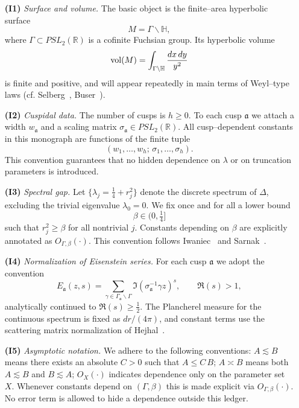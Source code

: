 \begin{itemize}[leftmargin=2em]

  \item[\textbf{(I1)}] \textit{Surface and volume.}  
  The basic object is the finite–area hyperbolic surface
  \[
    M = \Gamma \backslash \mathbb{H},
  \]
  where $\Gamma \subset PSL_{2}(\mathbb{R})$ is a cofinite Fuchsian group.  
  Its hyperbolic volume
  \[
    \operatorname{vol}(M) = \int_{\Gamma \backslash \mathbb{H}} \frac{dx\,dy}{y^{2}}
  \]
  is finite and positive, and will appear repeatedly in main terms of Weyl–type laws
  (cf. Selberg~\cite{Selberg1956}, Buser~\cite{Buser1992}).

  \item[\textbf{(I2)}] \textit{Cuspidal data.}  
  The number of cusps is $h \geq 0$.  
  To each cusp $\mathfrak{a}$ we attach a width $w_{\mathfrak{a}}$ and a scaling matrix 
  $\sigma_{\mathfrak{a}} \in PSL_{2}(\mathbb{R})$.  
  All cusp–dependent constants in this monograph are functions of the finite tuple
  \[
    (w_{1}, \dots, w_{h}; \, \sigma_{1}, \dots, \sigma_{h}).
  \]
  This convention guarantees that no hidden dependence on $\lambda$ or on truncation
  parameters is introduced.

  \item[\textbf{(I3)}] \textit{Spectral gap.}  
  Let $\{ \lambda_{j} = \tfrac14 + r_{j}^{2} \}$ denote the discrete spectrum of $\Delta$,
  excluding the trivial eigenvalue $\lambda_{0}=0$.  
  We fix once and for all a lower bound
  \[
    \beta \in (0, \tfrac14]
  \]
  such that $r_{j}^{2} \geq \beta$ for all nontrivial $j$.  
  Constants depending on $\beta$ are explicitly annotated as $O_{\Gamma,\beta}(\cdot)$.  
  This convention follows Iwaniec~\cite{Iwaniec2002} and Sarnak~\cite{Sarnak2004}.

  \item[\textbf{(I4)}] \textit{Normalization of Eisenstein series.}  
  For each cusp $\mathfrak{a}$ we adopt the convention
  \[
    E_{\mathfrak{a}}(z, s) = \sum_{\gamma \in \Gamma_{\mathfrak{a}} \backslash \Gamma}
    \Im(\sigma_{\mathfrak{a}}^{-1}\gamma z)^{s}, \qquad \Re(s) > 1,
  \]
  analytically continued to $\Re(s) \geq \tfrac12$.  
  The Plancherel measure for the continuous spectrum is fixed as $dr/(4\pi)$, and
  constant terms use the scattering matrix normalization of Hejhal~\cite{Hejhal1983}.  

  \item[\textbf{(I5)}] \textit{Asymptotic notation.}  
  We adhere to the following conventions:  
  $A \lesssim B$ means there exists an absolute $C>0$ such that $A \leq C\,B$;  
  $A \asymp B$ means both $A \lesssim B$ and $B \lesssim A$;  
  $O_{X}(\cdot)$ indicates dependence only on the parameter set $X$.  
  Whenever constants depend on $(\Gamma,\beta)$ this is made explicit via
  $O_{\Gamma,\beta}(\cdot)$.  
  No error term is allowed to hide a dependence outside this ledger.


\end{itemize}
